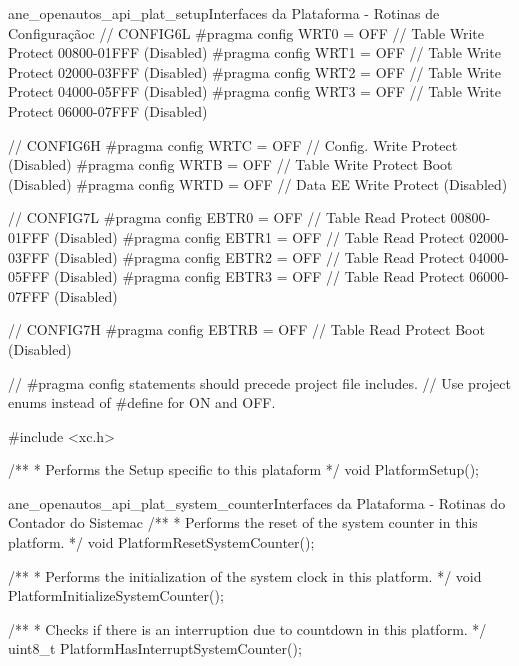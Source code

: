 \begin{algoritmo}{ane_openautos_api_plat_setup}{Interfaces da Plataforma - Rotinas de Configuração}{c}
// CONFIG6L
#pragma config WRT0 = OFF       // Table Write Protect 00800-01FFF (Disabled)
#pragma config WRT1 = OFF       // Table Write Protect 02000-03FFF (Disabled)
#pragma config WRT2 = OFF       // Table Write Protect 04000-05FFF (Disabled)
#pragma config WRT3 = OFF       // Table Write Protect 06000-07FFF (Disabled)

// CONFIG6H
#pragma config WRTC = OFF       // Config. Write Protect (Disabled)
#pragma config WRTB = OFF       // Table Write Protect Boot (Disabled)
#pragma config WRTD = OFF       // Data EE Write Protect (Disabled)

// CONFIG7L
#pragma config EBTR0 = OFF      // Table Read Protect 00800-01FFF (Disabled)
#pragma config EBTR1 = OFF      // Table Read Protect 02000-03FFF (Disabled)
#pragma config EBTR2 = OFF      // Table Read Protect 04000-05FFF (Disabled)
#pragma config EBTR3 = OFF      // Table Read Protect 06000-07FFF (Disabled)

// CONFIG7H
#pragma config EBTRB = OFF      // Table Read Protect Boot (Disabled)

// #pragma config statements should precede project file includes.
// Use project enums instead of #define for ON and OFF.

#include <xc.h>

/**
* Performs the Setup specific to this plataform
*/
void PlatformSetup();
\end{algoritmo}

\begin{algoritmo}{ane_openautos_api_plat_system_counter}{Interfaces da Plataforma - Rotinas do Contador do Sistema}{c}
/**
* Performs the reset of the system counter in this platform.
*/
void PlatformResetSystemCounter();

/**
* Performs the initialization of the system clock in this platform.
*/
void PlatformInitializeSystemCounter();

/**
* Checks if there is an interruption due to countdown in this platform.
*/
uint8_t PlatformHasInterruptSystemCounter();
\end{algoritmo}

